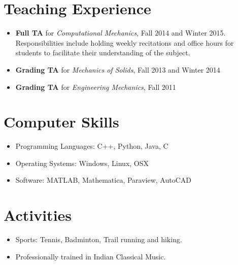 \documentclass[10pt,fleqn]{article}
\begin{document}
\section*{Teaching Experience}
\begin{itemize}
\item \textbf{Full TA} for \emph{Computational Mechanics}, Fall 2014 and Winter 2015.\\
Responsibilities include holding weekly recitations and office hours for students to facilitate their understanding of the subject.
\item \textbf{Grading TA} for \emph{Mechanics of Solids}, Fall 2013 and Winter 2014
\item \textbf{Grading TA} for \emph{Engineering Mechanics}, Fall 2011
\end{itemize}
\section*{Computer Skills}
\begin{itemize}
\item Programming Languages: C++, Python, Java, C
\item Operating Systems: Windows, Linux, OSX
\item Software: MATLAB, Mathematica, Paraview, AutoCAD
\end{itemize}

\section*{Activities}
\begin{itemize}
\item Sports: Tennis, Badminton, Trail running and hiking.
\item Professionally trained in Indian Classical Music.
\end{itemize}
\end{document}
